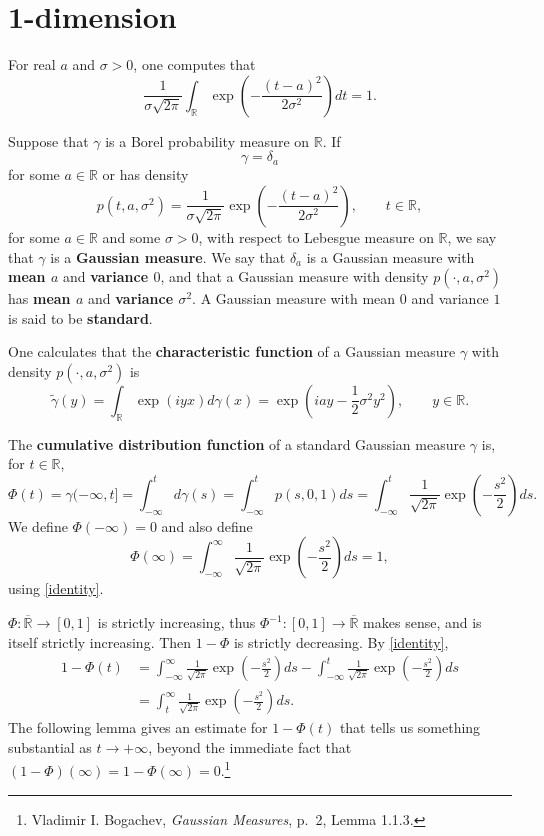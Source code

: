 \documentclass{article}
\theoremstyle{definition}
\begin{document}
\section{1-dimension}
For real $a$ and $\sigma>0$, one computes that
\begin{equation}
\frac{1}{\sigma \sqrt{2\pi}} \int_{\mathbb{R}} \exp\left( - \frac{(t-a)^2}{2\sigma^2} \right) dt = 1.
\label{identity}
\end{equation}

Suppose that $\gamma$ is a Borel probability measure on $\mathbb{R}$. If 
\[
\gamma=\delta_a
\]
 for some
$a \in \mathbb{R}$ or has density
\[
p(t,a,\sigma^2) = \frac{1}{\sigma\sqrt{2\pi}}  \exp\left( - \frac{(t-a)^2}{2\sigma^2} \right),
\qquad t \in \mathbb{R},
\]
for some $a \in \mathbb{R}$ and some $\sigma>0$,
with respect to Lebesgue measure on $\mathbb{R}$, we say that $\gamma$ is a \textbf{Gaussian measure}.
We say that $\delta_a$ is a Gaussian measure with \textbf{mean $a$} and \textbf{variance $0$}, and
that a Gaussian measure with density $p(\cdot,a,\sigma^2)$ has \textbf{mean $a$} and \textbf{variance $\sigma^2$}.
A Gaussian measure with mean $0$ and variance $1$ is said to be \textbf{standard}.

One calculates that the \textbf{characteristic function} of a Gaussian measure $\gamma$ with density $p(\cdot,a,\sigma^2)$
is
\begin{equation}
\widetilde{\gamma}(y) = \int_{\mathbb{R}} \exp(i yx) d\gamma(x)
=\exp\left( iay - \frac{1}{2}\sigma^2 y^2 \right), \qquad y \in \mathbb{R}.
\label{characteristic}
\end{equation}

The \textbf{cumulative distribution function} of a standard Gaussian measure  $\gamma$ is, for
$t \in \mathbb{R}$,
\[
\Phi(t) = \gamma(-\infty,t] =\int_{-\infty}^t d\gamma(s) = 
\int_{-\infty}^t p(s,0,1) ds
=\int_{-\infty}^t \frac{1}{\sqrt{2\pi}} \exp\left(- \frac{s^2}{2} \right) ds.
\]
We define $\Phi(-\infty)=0$ and also define 
\[
\Phi(\infty) = \int_{-\infty}^\infty \frac{1}{\sqrt{2\pi}} \exp\left(- \frac{s^2}{2} \right) ds = 1,
\]
using \eqref{identity}.

$\Phi:\overline{\mathbb{R}} \to [0,1]$ is strictly increasing, thus 
$\Phi^{-1}:[0,1] \to \overline{\mathbb{R}}$ makes sense, and is itself strictly increasing. Then 
$1-\Phi$ is strictly decreasing.
By \eqref{identity},
\begin{align*}
1-\Phi(t) &=  \int_{-\infty}^\infty \frac{1}{\sqrt{2\pi}} \exp\left( - \frac{s^2}{2} \right) ds
-\int_{-\infty}^t \frac{1}{\sqrt{2\pi}} \exp\left(- \frac{s^2}{2} \right) ds\\
&=\int_t^\infty \frac{1}{\sqrt{2\pi}} \exp\left(- \frac{s^2}{2} \right) ds.
\end{align*}
The following lemma gives an estimate for
$1-\Phi(t)$ that tells us something substantial as $t \to +\infty$, beyond the immediate fact that $(1-\Phi)(\infty)=1-\Phi(\infty)=0$.\footnote{Vladimir I. Bogachev,
{\em Gaussian Measures}, p.~2, Lemma 1.1.3.}
\end{document}

